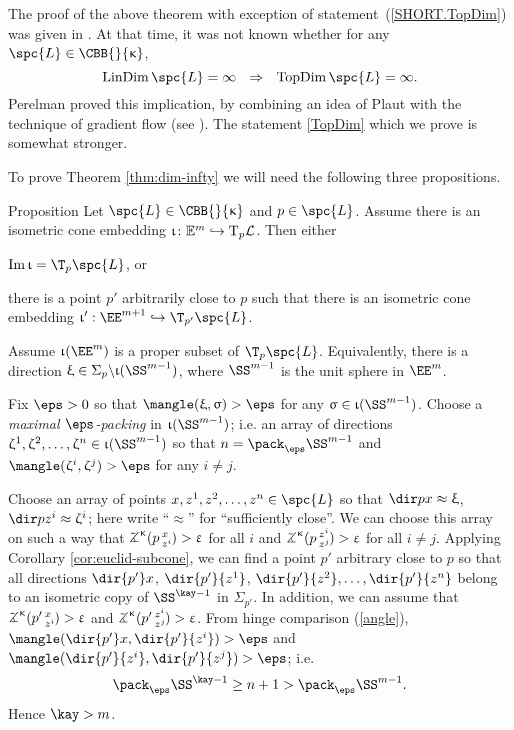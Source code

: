 The proof of the above theorem with exception of  statement~(\ref{SHORT.TopDim}) was given in \cite{plaut:dimension}.
At that time, it was not known whether for any $\spc{L}\in\CBB{}{\kappa}$,
\[\LinDim\spc{L}=\infty\ \ \Rightarrow\ \ \TopDim\spc{L}=\infty.\]
Perelman proved this implication, 
by combining an idea of Plaut with the technique of gradient flow (see \cite{perelman-petrunin:qg}).
The statement \ref{TopDim} which we prove is somewhat stronger.


To prove Theorem \ref{thm:dim-infty}  we will need the following three propositions.


\begin{thm}{Proposition}\label{E=T}
Let $\spc{L}\in\CBB{}{\kappa}$ and $p\in \spc{L}$.
Assume there is an isometric cone embedding $\iota\:\EE^{m}\hookrightarrow \T_p\spc{L}$.  Then either
\begin{subthm}{}
 $\Im\iota=\T_p\spc{L}$, or
\end{subthm}

\begin{subthm}{} there is a point $p'$ arbitrarily close to $p$ such that there is an isometric cone embedding $\iota':\EE^{m+1}\hookrightarrow \T_{p'}\spc{L}$.
\end{subthm}
\end{thm}


Assume $\iota(\EE^{m})$ is a proper subset of $\T_p\spc{L}$.
Equivalently, there is a direction $\xi \in \Sigma_p\backslash\iota(\SS^{m-1})$,
where $\SS^{m-1}$ is the unit sphere in  $\EE^{m}$. 

Fix $\eps>0$ so that $\mangle(\xi,\sigma)>\eps$ for any $\sigma\in \iota(\SS^{m-1})$. 
Choose a \emph{maximal $\eps$-packing} in $\iota(\SS^{m-1})$;
i.e. an array of directions $\zeta^1,\zeta^2,\dots,\zeta^n\in \iota(\SS^{m-1})$ so that $n=\pack_\eps \SS^{m-1}$ and $\mangle(\zeta^i,\zeta^j)>\eps$ for any $i\not=j$.

Choose an array of points $x,z^1,z^2,\dots,z^n\in\spc{L}$ so that
$\dir p x\approx\xi$, $\dir p{z^i}\approx\zeta^i$;
here write ``$\approx$'' for ``sufficiently close''.
We can choose this array on such a way that 
$\angk{\kappa}p x{z^i}>\eps$ for all $i$ 
and $\angk{\kappa}p{z^i}{z^j}>\eps$ for all $i\not=j$.
Applying Corollary \ref{cor:euclid-subcone}, we can find a point $p'$ arbitrary close to  $p$ 
so that all directions $\dir{p'}x$, $\dir{p'}{z^1}$, $\dir{p'}{z^2},\dots,\dir{p'}{z^n}$
belong to an isometric copy of $\SS^{\kay-1}$ in $\Sigma_{p'}$.
In addition, we can assume that $\angk{\kappa}{p'}x{z^i}>\eps$ and $\angk{\kappa}{p'}{z^i}{z^j}>\eps$.
From hinge comparison (\ref{angle}),
$\mangle(\dir{p'}x,\dir{p'}{z^i})>\eps$ 
and $\mangle(\dir{p'}{z^i},\dir{p'}{z^j})>\eps$;
i.e. 
\[\pack_\eps \SS^{\kay-1}\ge n+1>\pack_\eps \SS^{m-1}.\] 
Hence $\kay>m$.
\qeds


